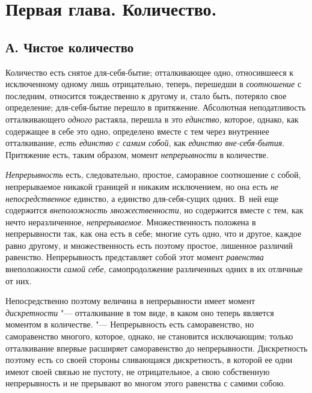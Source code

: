 \chapter[{\em Первая глава} \\ Количество]{Первая глава. Количество.}
\section[А. Чистое количество]{А. Чистое количество}

Количество есть снятое для-себя-бытие; отталкивающее одно, относившееся к
исключенному одному лишь отрицательно, теперь, перешедши в
{\em соотношение} с последним, относится тождественно к
другому и, стало быть, потеряло свое определение; для-себя-бытие перешло в
притяжение. Абсолютная неподатливость отталкивающего
{\em одного} растаяла, перешла в это
{\em единство}, которое, однако, как содержащее в себе
это одно, определено вместе с тем через внутреннее отталкивание,
{\em есть единство с самим собой}, как
{\em единство вне-себя-бытия}. Притяжение есть, таким
образом, момент {\em непрерывности} в количестве.

{\em Непрерывность} есть, следовательно, простое,
саморавное соотношение с собой, непрерываемое никакой границей и никаким
исключением, но она есть {\em не непосредственное}
единство, а единство для-себя-сущих одних. В~ней еще содержится
{\em внеположность множественности}, но содержится
вместе с тем, как нечто неразличенное,
{\em непрерываемое}. Множественность положена в
непрерывности так, как она есть в себе; многие суть одно, что и другое,
каждое равно другому, и множественность есть поэтому простое, лишенное
различий равенство. Непрерывность представляет собой этот момент
{\em равенства} внеположности {\em самой себе}, самопродолжение
различенных одних в их отличные от них.

Непосредственно поэтому величина в непрерывности имеет момент
{\em дискретности} "--- отталкивание в том виде, в каком
оно теперь является моментом в количестве. "--- Непрерывность есть
саморавенство, но саморавенство многого, которое, однако, не становится
исключающим; только отталкивание впервые расширяет саморавенство до
непрерывности. Дискретность поэтому есть со своей стороны сливающаяся
дискретность, в которой ее одни имеют своей связью не пустоту, не
отрицательное, а свою собственную непрерывность и не прерывают во многом
этого равенства с самими собою.

